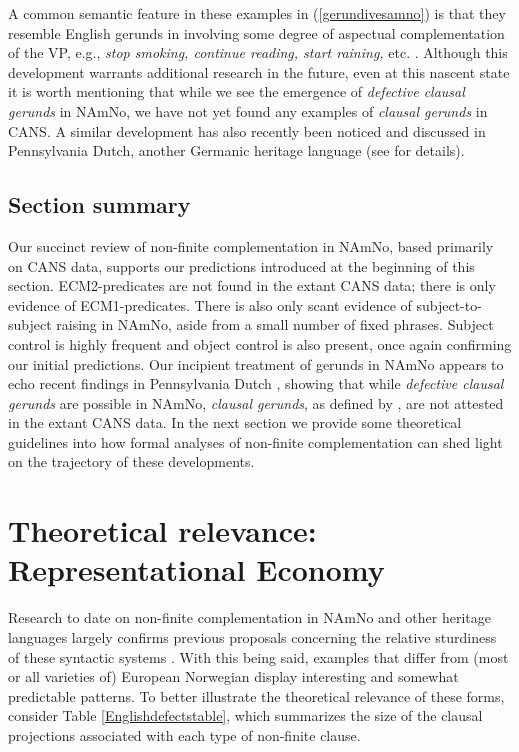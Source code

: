 \documentclass[output=paper,colorlinks,citecolor=brown]{langscibook}
\begin{document}
A common semantic feature in these examples in  (\ref{gerundivesamno}) is that they resemble English gerunds in involving some degree of aspectual complementation of the VP, e.g., \textit{stop smoking, continue reading, start raining,} etc. \citep{freed79}. Although this development warrants additional research in the future, even at this nascent state it is worth mentioning that while we see the emergence of \textit{defective clausal gerunds} in NAmNo, we have not yet found any examples of \textit{clausal gerunds} in CANS. A similar development has also recently been noticed and discussed in Pennsylvania Dutch, another Germanic heritage language (see \citealt{putPDtoappear} for details). 

\subsection{Section summary} \label{subsect-summary3}

Our succinct review of non-finite complementation in NAmNo, based primarily on CANS data, supports our predictions introduced at the beginning of this section. ECM2-predicates are not found in the extant CANS data; there is only evidence of ECM1-predicates. There is also only scant evidence of subject-to-subject raising in NAmNo, aside from a small number of fixed phrases. Subject control is highly frequent and object control is also present, once again confirming our initial predictions. Our incipient treatment of gerunds in NAmNo appears to echo recent findings in Pennsylvania Dutch \citep{putPDtoappear}, showing that while \textit{defective clausal gerunds} are possible in NAmNo, \textit{clausal gerunds}, as defined by \citet{pires2007}, are not attested in the extant CANS data. In the next section we provide some theoretical guidelines into how formal analyses of non-finite complementation can shed light on the trajectory of these developments. 


\section{Theoretical relevance: Representational Economy} \label{section-theory}

Research to date on non-finite complementation in NAmNo and other heritage languages largely confirms previous proposals concerning the relative sturdiness of these syntactic systems \citep{polinsky18,lohndal2021}. With this being said, examples that differ from (most or all varieties of) European Norwegian display interesting and somewhat predictable patterns. To better illustrate the theoretical relevance of these forms, consider Table \ref{Englishdefectstable}, which summarizes the size of the clausal projections associated with each type of non-finite clause.
\end{document}

